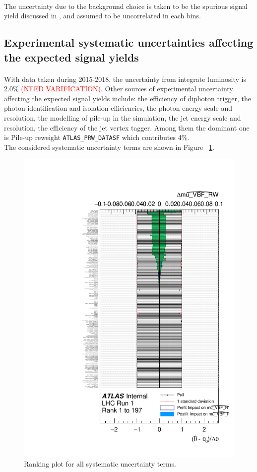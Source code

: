 \paragraph{} The uncertainty due to the background choice is taken to be the spurious signal yield discussed in \Sect{\ref{ssec:spurious_signal}}, and assumed to be uncorrelated in each bins. 


\subsection{Experimental systematic uncertainties affecting the expected signal yields}
\label{ssec:expuncert}

\paragraph{} With data taken during 2015-2018, the uncertainty from integrate luminosity is 2.0\% \textcolor{red}{(NEED VARIFICATION)}. Other sources of experimental uncertainty affecting the expected signal yields include: the efficiency of diphoton trigger, the photon identification and isolation efficiencies, the photon energy scale and resolution, the modelling of pile-up in the simulation, the jet energy scale and resolution, the efficiency of the jet vertex tagger. Among them the dominant one is Pile-up reweight \texttt{ATLAS\_PRW\_DATASF} which contributes 4\%. \\

The considered systematic uncertainty terms are shown in Figure ~\ref{fig:syst_ranking}. 

\begin{figure}[h]
  \centering
  \includegraphics[width=.9\textwidth]{figure/ranking_allcats.pdf}
  \caption{Ranking plot for all systematic uncertainty terms. }
  \label{fig:syst_ranking}
\end{figure}


